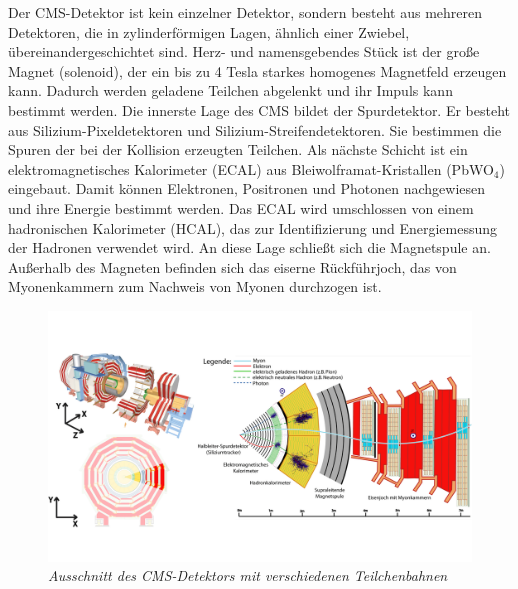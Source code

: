 Der CMS-Detektor ist kein einzelner Detektor, sondern besteht aus mehreren Detektoren, die in zylinderf\"ormigen Lagen, \"ahnlich einer Zwiebel, \"ubereinandergeschichtet sind. Herz- und namensgebendes St\"uck ist der gro\ss e Magnet (solenoid), der ein bis zu \num{4} Tesla starkes homogenes Magnetfeld erzeugen kann. Dadurch werden geladene Teilchen abgelenkt und ihr Impuls kann bestimmt werden. Die innerste Lage des CMS bildet der Spurdetektor. Er besteht aus Silizium-Pixeldetektoren und Silizium-Streifendetektoren. Sie bestimmen die Spuren der bei der Kollision erzeugten Teilchen. Als n\"achste Schicht ist ein elektromagnetisches Kalorimeter (ECAL) aus Bleiwolframat-Kristallen (PbWO$_4$) eingebaut. Damit k\"onnen Elektronen, Positronen und Photonen nachgewiesen und ihre Energie bestimmt werden. Das ECAL wird umschlossen von einem hadronischen Kalorimeter (HCAL), das zur Identifizierung und Energiemessung der Hadronen verwendet wird. An diese Lage schlie\ss t sich die Magnetspule an. Au\ss erhalb des Magneten befinden sich das eiserne R\"uckf\"uhrjoch, das von Myonenkammern zum Nachweis von Myonen durchzogen ist.\\

\begin{figure}[hhh]
 \begin{center}
   \includegraphics[width=\textwidth]{graphics/cms_slice.png}
   \parbox[b]{12cm}{
     \caption[CMS-Detektor]
             {\label{fig:cms_slice} \it\!Ausschnitt des CMS-Detektors mit verschiedenen Teilchenbahnen \cite{cms_slice}}
   }
 \end{center}
\end{figure}

